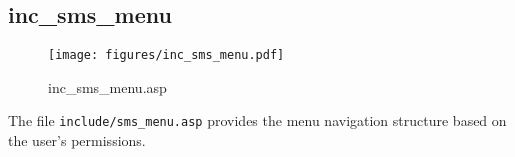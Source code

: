 \subsection{inc\_sms\_menu}
\begin{figure}[htb]
    \begin{center}
        \texttt{[image: figures/inc\_sms\_menu.pdf]}
    \end{center}
    \caption{inc\_sms\_menu.asp}
    \label{fig:inc_sms_menu}
\end{figure}

The file \verb|include/sms_menu.asp| provides the menu navigation structure
based on the user's permissions.
